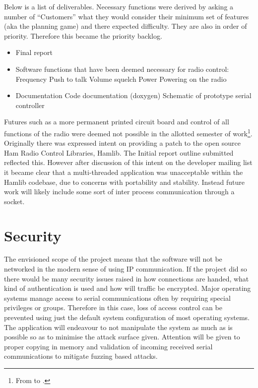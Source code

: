 Below is a list of deliverables. Necessary functions were derived by asking a number of ``Customers'' what they would consider their minimum set of features (aka the planning game) and there expected difficulty. They are also in order of priority. Therefore this became the priority backlog.

\begin{itemize}
    \item Final report
    \item Software functions that have been deemed necessary for radio control:
        \subitem Frequency
        \subitem Push to talk
        \subitem Volume
        \subitem \gls{squelch}
        \subitem Power
        \subitem Powering on the radio
    \item Documentation
        \subitem Code documentation (\gls{doxygen})
        \subitem Schematic of prototype serial controller
\end{itemize}

Futures such as a more permanent printed circuit board and control of all functions of the radio were deemed not possible in the allotted semester of work\footnote{From  to .}. Originally there was expressed intent on providing a patch to the open source Ham Radio Control Libraries, Hamlib\cite{hamlib}. The Initial report outline submitted reflected this. However after discussion of this intent on the developer mailing list it became clear that a multi-threaded application was unacceptable within the Hamlib codebase, due to concerns with portability and stability. Instead future work will likely include some sort of inter process communication through a socket.

\section{Security}
The envisioned scope of the project means that the software will not be networked in the modern sense of using IP communication. If the project did so there would be many security issues raised in how connections are handed, what kind of authentication is used and how will traffic be encrypted. Major operating systems manage access to serial communications often by requiring special privileges or groups. Therefore in this case, loss of access control can be prevented using just the default system configuration of most operating systems. The application will endeavour to not manipulate the system as much as is possible so as to minimise the attack surface given. Attention will be given to proper copying in memory and validation of incoming received serial communications to mitigate fuzzing based attacks.

